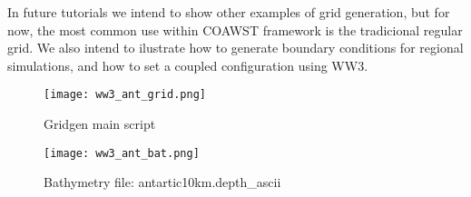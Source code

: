  In future tutorials we intend to show other examples of grid generation, but for now, the most common use within COAWST framework is the tradicional regular 
grid. We also intend to ilustrate how to generate boundary conditions for regional simulations, and how to set a coupled configuration using WW3.  
\bigskip

\begin{figure} [!htb] 
\centering
\texttt{[image: ww3\_ant\_grid.png]}
\caption{Gridgen main script}
\label{fig1}
\end{figure}


\begin{figure} [!htb] 
\centering
\texttt{[image: ww3\_ant\_bat.png]}
\caption{Bathymetry file: antartic10km.depth\_ascii}
\label{fig2}
\end{figure}
